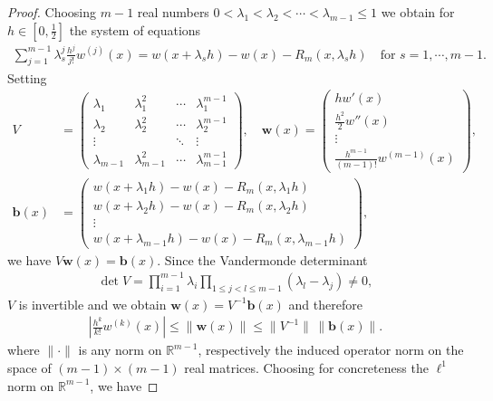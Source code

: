 \documentclass[11pt,a4paper,reqno]{amsart}
\theoremstyle{plain}
\theoremstyle{definition}
\begin{document}
\begin{proof}
	Choosing $m-1$ real numbers $0<\lambda_1 < \lambda_2 < \cdots < \lambda_{m-1} \leq 1$ we obtain for $h\in [0, \frac{1}{2}]$ the system of equations
	\begin{align}\label{eq:kl-system}
		\sum_{j=1}^{m-1} \lambda_s^j \frac{h^j}{j!} w^{(j)}(x) = w(x+\lambda_s h) - w(x) - R_m(x, \lambda_s h) \quad \text{for } s = 1, \cdots, m-1.
	\end{align}
	Setting
	\begin{align*}
		V &= \begin{pmatrix} 	
		\lambda_1 & \lambda_1^2 & \cdots & \lambda_1^{m-1} \\
 		\lambda_2 & \lambda_2^2 & \cdots & \lambda_2^{m-1} \\
 		\vdots    &      &    \ddots    & \vdots \\
 		\lambda_{m-1} & \lambda_{m-1}^2& \cdots & \lambda_{m-1}^{m-1}
 			\end{pmatrix},
 		\quad \mathbf{w}(x) = \begin{pmatrix}
 			h w'(x) \\ \frac{h^2}{2} w''(x) \\ \vdots \\ \frac{h^{m-1}}{(m-1)!} w^{(m-1)}(x)
			 \end{pmatrix},\\
  		\mathbf{b}(x) &= \begin{pmatrix} w(x+\lambda_1 h) - w(x) - R_m(x, \lambda_1 h) \\ w(x+\lambda_2 h) - w(x) - R_m(x, \lambda_2 h) \\ \vdots \\ w(x+\lambda_{m-1} h) - w(x) - R_m(x, \lambda_{m-1} h)
  			\end{pmatrix},
	\end{align*}
	we have $V \mathbf{w}(x) = \mathbf{b}(x)$.
	Since the Vandermonde determinant
	\begin{align*}
	\det V = \prod_{i=1}^{m-1} \lambda_i \prod_{1\leq j<l \leq m-1} (\lambda_l - \lambda_j) \neq 0,
	\end{align*}
	$V$ is invertible and we obtain $\mathbf{w}(x) = V^{-1} \mathbf{b}(x)$ and therefore
	\begin{align}\label{eq:KL-normestimate}
		\left|\frac{h^{k}}{k!} w^{(k)}(x)\right| \leq \|\mathbf{w}(x)\| \leq \|V^{-1}\| \, \|\mathbf{b}(x)\|.
	\end{align}
	where $\|\cdot\|$ is any norm on ${\mathbb{R}}^{m-1}$, respectively the induced operator norm on the space of $(m-1)\times (m-1)$ real matrices. Choosing for concreteness the $\ell^{1}$ norm on ${\mathbb{R}}^{m-1}$, we have

\end{proof}
\end{document}
